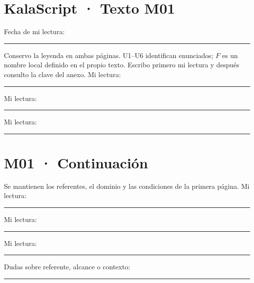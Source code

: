 \documentclass[11pt,a4paper]{article}
\begin{document}
\section*{KalaScript · Texto M01}
\KalaContextoTexto
\par Fecha de mi lectura: \rule{55mm}{.3pt}
\par Conservo la leyenda en ambas páginas. U1--U6 identifican enunciados;
\(F\) es un nombre local definido en el propio texto. Escribo primero mi lectura
y después consulto la clave del anexo.
Mi lectura: \par\vspace{6mm}\hrule
{}
Mi lectura: \par\vspace{6mm}\hrule
{}
Mi lectura: \par\vspace{6mm}\hrule
\clearpage
\section*{M01 · Continuación}
Se mantienen los referentes, el dominio y las condiciones de la primera página.
Mi lectura: \par\vspace{6mm}\hrule
{}
Mi lectura: \par\vspace{6mm}\hrule
{}
Mi lectura: \par\vspace{6mm}\hrule
\par\vspace{5mm}Dudas sobre referente, alcance o contexto:\par\vspace{8mm}\hrule
\end{document}
